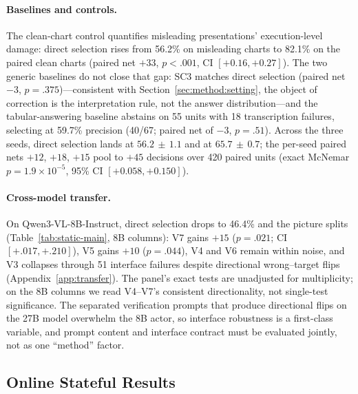\paragraph{Baselines and controls.}
The clean-chart control quantifies misleading presentations' execution-level damage: direct selection
rises from 56.2\% on misleading charts to 82.1\% on the
paired clean charts (paired net $+33$, $p<.001$, CI $[+0.16, +0.27]$).
The two generic baselines do not close that gap: SC3
matches direct selection
(paired net $-3$, $p=.375$)---consistent with
Section~\ref{sec:method:setting}, the object of
correction is the interpretation rule, not the answer
distribution---and the tabular-answering baseline abstains on 55 units with 18 transcription
failures, selecting at 59.7\% precision (40/67; paired
net of $-3$, $p=.51$).
Across the three seeds, direct selection lands at
$56.2\,\pm\,1.1$ and \ours{} at $65.7\,\pm\,0.7$; the per-seed paired nets $+12$, $+18$,
$+15$ pool to $+45$ decisions over 420 paired units
(exact McNemar $p=1.9\times10^{-5}$, 95\% CI
$[+0.058, +0.150]$).

\paragraph{Cross-model transfer.}
On Qwen3-VL-8B-Instruct, direct selection drops to
46.4\% and the picture splits
(Table~\ref{tab:static-main}, 8B columns): V7 gains
$+15$ ($p=.021$; CI $[+.017,+.210]$), V5 gains $+10$ ($p=.044$), V4 and V6 remain within noise, and
V3 collapses through 51 interface failures despite
directional wrong--target flips (Appendix~\ref{app:transfer}). The panel's exact tests are unadjusted for multiplicity; on the 8B columns we read V4--V7's consistent directionality, not single-test significance. The separated verification prompts that produce
directional flips on the 27B model overwhelm the 8B
actor, so interface robustness is a first-class
variable, and prompt content and interface contract
must be evaluated jointly, not as one ``method'' factor.

\subsection{Online Stateful Results}\label{sec:exp:online}



